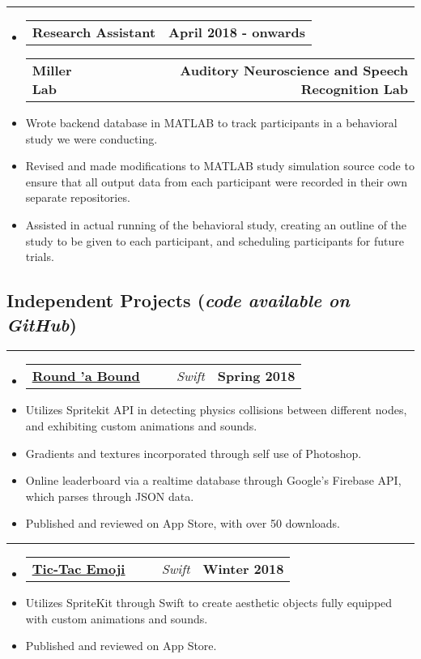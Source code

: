 \documentclass[10pt,letterpaper]{article}
\makeatletter
\newcommand{\header}[2]
{
	\begin{tabular*}{\linewidth}{l@{\extracolsep{\fill}}r}
		#1 &
		#2 \\
	\end{tabular*}
}
\newcommand{\sectionbreak}
{
	\vspace{-1.2em}
	\rule{\textwidth}{1.7pt}
	\vspace{-1.7em}
}
\makeatother
\begin{document}
\hrule

\begin{itemize}
	\item[]
		\header
			{\textbf{Research Assistant}} 
			{\textbf{April 2018 - onwards }}
		\header
		{\textbf{Miller Lab}}
		{\textbf{Auditory Neuroscience and Speech Recognition Lab}} 
		\item
			Wrote backend database in MATLAB to track participants in a behavioral study we were conducting.
		\item
			Revised and made modifications to MATLAB study simulation source code to ensure that all output data from each participant were recorded in their own separate repositories.
		\item 
			Assisted in actual running of the behavioral study, creating an outline of the study to be given to each participant, and scheduling participants for future trials.

\end{itemize}

\vspace{-1.5em}

\subsection*{Independent Projects (\emph{code available on GitHub})}
\sectionbreak

	

\begin{itemize}
	\item[]
		\header 
		{
		\href{https://itunes.apple.com/us/app/round-bound/id1369632746?mt=8}{\underline{\textbf{Round 'a Bound}}} \ \ \ \ \ \emph{Swift}
		}
			{\textbf{Spring 2018}}
		\item 
			Utilizes Spritekit API in detecting physics collisions between different nodes, and exhibiting custom animations and sounds.
		\item
			Gradients and textures incorporated through self use of Photoshop.
		\item
			Online leaderboard via a realtime database through Google's Firebase API, which parses through JSON data. 
		\item
			Published and reviewed on App Store, with over 50 downloads. 
\end{itemize}

\hrule

\begin{itemize}
	\item[]
		\header
			{
				\href{https://itunes.apple.com/us/app/tic-tac-emoji/id1346934986?mt=8}{\underline{\textbf{Tic-Tac Emoji}}} \ \ \ \ \ \emph{Swift}
				}
				{\textbf{Winter 2018}}
		\item
			Utilizes SpriteKit through Swift to create aesthetic objects fully equipped with custom animations and sounds.	
		\item
			Published and reviewed on App Store. 
\end{itemize}
\end{document}
